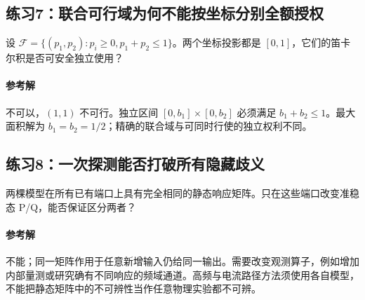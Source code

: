 \subsection{练习7：联合可行域为何不能按坐标分别全额授权}
设 $\mathcal F=\{(p_1,p_2):p_i\geq0,p_1+p_2\leq1\}$。两个坐标投影都是 $[0,1]$，它们的笛卡尔积是否可安全独立使用？
\paragraph{参考解}不可以，$(1,1)$ 不可行。独立区间 $[0,b_1]\times[0,b_2]$ 必须满足 $b_1+b_2\leq1$。最大面积解为 $b_1=b_2=1/2$；精确的联合域与可同时行使的独立权利不同。

\subsection{练习8：一次探测能否打破所有隐藏歧义}
两棵模型在所有已有端口上具有完全相同的静态响应矩阵。只在这些端口改变准稳态 P/Q，能否保证区分两者？
\paragraph{参考解}不能；同一矩阵作用于任意新增输入仍给同一输出。需要改变观测算子，例如增加内部量测或研究确有不同响应的频域通道。高频与电流路径方法须使用各自模型，不能把静态矩阵中的不可辨性当作任意物理实验都不可辨。
